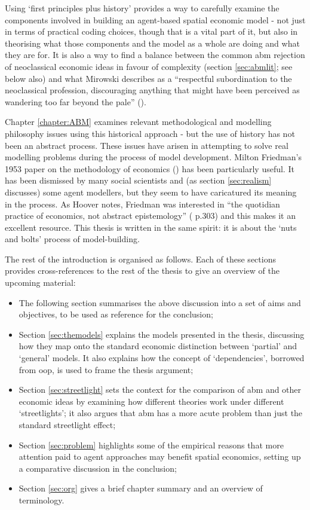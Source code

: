 Using `first principles plus history' provides a way to carefully examine the components involved in building an agent-based spatial economic model - not just in terms of practical coding choices, though that is a vital part of it, but also in theorising what those components and the model as a whole are doing and what they are for. It is also a way to find a balance between the common \gls{abm} rejection of neoclassical economic ideas in favour of complexity (section \ref{sec:abmlit}; see below also) and what Mirowski describes as a ``respectful subordination to the neoclassical profession, discouraging anything that might have been perceived as wandering too far beyond the pale'' (\citealt{mirowski_kicking_2007}). 

Chapter \ref{chapter:ABM} examines relevant methodological and modelling philosophy issues using this historical approach - but the use of history has not been an abstract process. These issues have arisen in attempting to solve real modelling problems during the process of model development. Milton Friedman's 1953 paper on the methodology of economics (\citealt{friedman_essays_1953}) has been particularly useful. It has been dismissed by many social scientists and (as section \ref{sec:realism} discusses) some agent modellers, but they seem to have caricatured its meaning in the process. As Hoover notes, Friedman was interested in ``the quotidian practice of economics, not abstract epistemology'' (\citealt{maki_milton_2009} p.303) and this makes it an excellent resource. This thesis is written in the same spirit: it is about the `nuts and bolts' process of model-building. 

The rest of the introduction is organised as follows. Each of these sections provides cross-references to the rest of the thesis to give an overview of the upcoming material:

\begin{itemize}
	\item The following section summarises the above discussion into a set of aims and objectives, to be used as reference for the conclusion;
\item Section \ref{sec:themodels} explains the models presented in the thesis, discussing how they map onto the standard economic distinction between `partial' and `general' models. It also explains how the concept of `dependencies', borrowed from \gls{oop}, is used to frame the thesis argument;
\item Section \ref{sec:streetlight} sets the context for the comparison of \gls{abm} and other economic ideas by examining how different theories work under different `streetlights'; it also argues that \gls{abm} has a more acute problem than just the standard streetlight effect;
\item Section \ref{sec:problem} highlights some of the empirical reasons that more attention paid to agent approaches may benefit spatial economics, setting up a comparative discussion in the conclusion;
\item Section \ref{sec:org} gives a brief chapter summary and an overview of terminology.
\end{itemize}

